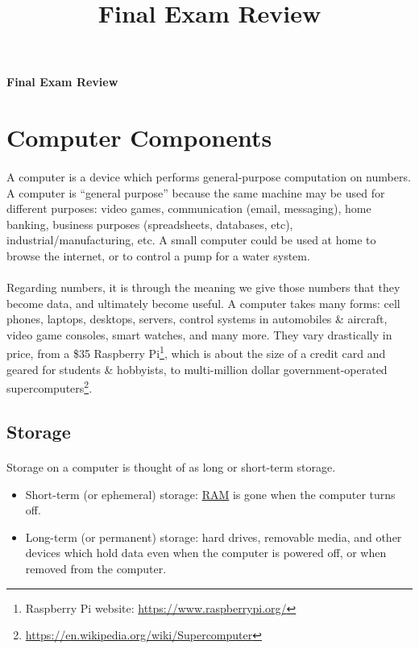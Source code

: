 \documentclass[letter,10pt]{article}
\title{Final Exam Review}
\begin{document}
\huge
\textbf{Final Exam Review}
\normalsize

\tableofcontents

\section{Computer Components}
\paragraph{}A computer is a device which performs general-purpose computation on numbers. A computer is ``general purpose'' because the same machine may be used for different purposes: video games, communication (email, messaging), home banking, business purposes (spreadsheets, databases, etc), industrial/manufacturing, etc. A small computer could be used at home to browse the internet, or to control a pump for a water system.

\paragraph{}Regarding numbers, it is through the meaning we give those numbers that they become data, and ultimately become useful. A computer takes many forms: cell phones, laptops, desktops, servers, control systems in automobiles \& aircraft, video game consoles, smart watches, and many more. They vary drastically in price, from a \$35 Raspberry Pi\footnote{Raspberry Pi website: \url{https://www.raspberrypi.org/}}, which is about the size of a credit card and geared for students \& hobbyists, to multi-million dollar government-operated supercomputers\footnote{\url{https://en.wikipedia.org/wiki/Supercomputer}}.

\subsection{Storage}
\paragraph{}Storage on a computer is thought of as long or short-term storage.
\begin{itemize}
    \item Short-term (or ephemeral) storage: \hyperref[sec:ram]{RAM} is gone when the computer turns off.
    \item Long-term (or permanent) storage: hard drives, removable media, and other devices which hold data even when the computer is powered off, or when removed from the computer.
\end{itemize}
\end{document}
